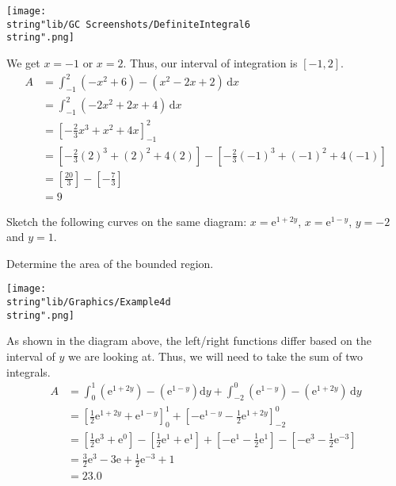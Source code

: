 \documentclass[11pt,a4paper]{book}
\begin{document}
\begin{example}
\begin{tasks}[label=(\alph*),label-width=3.5ex]
\begin{minipage}[t]{0.5\textwidth}
\end{minipage}
\begin{minipage}[t]{0.5\textwidth}
\begin{center}
\texttt{[image: \\string"lib/GC Screenshots/DefiniteIntegral6\\string".png]}
\par\end{center}
\end{minipage}

We get $x=-1$ or $x=2$. Thus, our interval of integration is $[-1,2]$.
\begin{align*}
A & =\int_{-1}^{2}(-x^{2}+6)-(x^{2}-2x+2)\,\mathrm{d}x\\
 & =\int_{-1}^{2}(-2x^{2}+2x+4)\,\mathrm{d}x\\
 & =\left[-\frac{2}{3}x^{3}+x^{2}+4x\right]_{-1}^{2}\\
 & =\left[-\frac{2}{3}(2)^{3}+(2)^{2}+4(2)\right]-\left[-\frac{2}{3}(-1)^{3}+(-1)^{2}+4(-1)\right]\\
 & =\left[\frac{20}{3}\right]-\left[-\frac{7}{3}\right]\\
 & =9
\end{align*}

\end{tasks}

\end{example}

\begin{example}
Sketch the following curves on the same diagram: $x=\mathrm{e}^{1+2y}$, $x=\mathrm{e}^{1-y}$, $y=-2$ and $y=1$. 

Determine the area of the bounded region.

\Solution

\begin{center}
\texttt{[image: \\string"lib/Graphics/Example4d\\string".png]}
\par\end{center}

As shown in the diagram above, the left/right functions differ based
on the interval of $y$ we are looking at. Thus, we will need to take
the sum of two integrals.
\begin{align*}
A & =\int_{0}^{1}\left(\mathrm{e}^{1+2y}\right)-\left(\mathrm{e}^{1-y}\right)\mathrm{d}y+\int_{-2}^{0}\left(\mathrm{e}^{1-y}\right)-\left(\mathrm{e}^{1+2y}\right)\,\mathrm{d}y\\
 & =\left[\frac{1}{2}\mathrm{e}^{1+2y}+\mathrm{e}^{1-y}\right]_{0}^{1}+\left[-\mathrm{e}^{1-y}-\frac{1}{2}\mathrm{e}^{1+2y}\right]_{-2}^{0}\\
 & =\left[\frac{1}{2}\mathrm{e}^{3}+\mathrm{e}^{0}\right]-\left[\frac{1}{2}\mathrm{e}^{1}+\mathrm{e}^{1}\right]+\left[-\mathrm{e}^{1}-\frac{1}{2}\mathrm{e}^{1}\right]-\left[-\mathrm{e}^{3}-\frac{1}{2}\mathrm{e}^{-3}\right]\\
 & =\frac{3}{2}\mathrm{e}^{3}-3\mathrm{e}+\frac{1}{2}\mathrm{e}^{-3}+1\\
 & =23.0
\end{align*}


\end{example}
\end{document}
